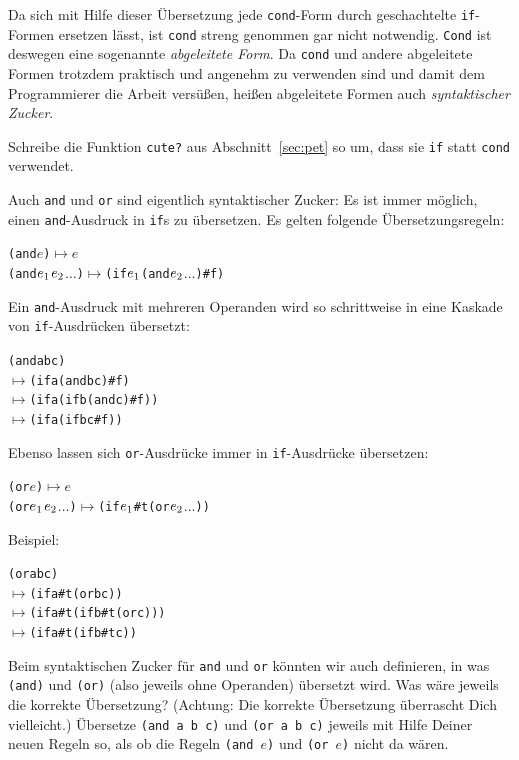 Da sich mit Hilfe dieser Übersetzung jede \texttt{cond}-Form durch
geschachtelte \texttt{if}-Formen ersetzen lässt, ist \texttt{cond}
streng genommen gar nicht notwendig.  \texttt{Cond} ist deswegen eine
sogenannte \textit{abgeleitete Form}.  Da \texttt{cond} und andere
abgeleitete Formen trotzdem praktisch und angenehm zu verwenden sind
und damit dem Programmierer die Arbeit versüßen,
heißen abgeleitete Formen auch \textit{syntaktischer
  Zucker}.

\begin{aufgabe}
  Schreibe die Funktion \texttt{cute?} aus Abschnitt~\ref{sec:pet} so
  um, dass sie \texttt{if} statt  \texttt{cond} verwendet.
\end{aufgabe}
%
Auch \texttt{and} und \texttt{or} sind eigentlich syntaktischer Zucker:
Es ist immer möglich, einen \texttt{and}-Ausdruck in \texttt{if}s
zu übersetzen.  Es gelten folgende Übersetzungsregeln:
%
\begin{alltt}
(and \(e\)) \(\mapsto\) \(e\)
(and \(e\sb{1}\) \(e\sb{2}\) \(\ldots\)) \(\mapsto\) (if \(e\sb{1}\) (and \(e\sb{2}\) \(\ldots\)) #f)
\end{alltt}
%
Ein \texttt{and}-Ausdruck mit mehreren Operanden wird so schrittweise
in eine Kaskade von \texttt{if}-Ausdrücken übersetzt:
%
\begin{alltt}
(and a b c)
\(\mapsto{}\) (if a (and b c) #f)
\(\mapsto{}\) (if a (if b (and c) #f))
\(\mapsto{}\) (if a (if b c #f))
\end{alltt}
%
Ebenso lassen sich \texttt{or}-Ausdrücke immer in
\texttt{if}-Ausdrücke übersetzen:
%
\begin{alltt}
(or \(e\)) \(\mapsto\) \(e\)
(or \(e\sb{1}\) \(e\sb{2}\) \(\ldots\)) \(\mapsto\) (if \(e\sb{1}\) #t (or \(e\sb{2}\) \(\ldots\)))
\end{alltt}
%
Beispiel:
%
\begin{alltt}
(or a b c)
\(\mapsto{}\) (if a #t (or b c))
\(\mapsto{}\) (if a #t (if b #t (or c)))
\(\mapsto{}\) (if a #t (if b #t c))
\end{alltt}
%
\begin{aufgabe}
  Beim syntaktischen Zucker für \texttt{and} und \texttt{or} könnten
  wir auch definieren, in was \texttt{(and)} und \texttt{(or)} (also
  jeweils ohne Operanden) übersetzt wird.  Was wäre jeweils die
  korrekte Übersetzung?  (Achtung: Die korrekte Übersetzung überrascht
  Dich vielleicht.)  Übersetze \texttt{(and a b c)} und \texttt{(or a
    b c)} jeweils mit Hilfe Deiner neuen Regeln so, als ob die Regeln
  \texttt{(and \(e\))} und \texttt{(or \(e\))} nicht da wären.
\end{aufgabe}

